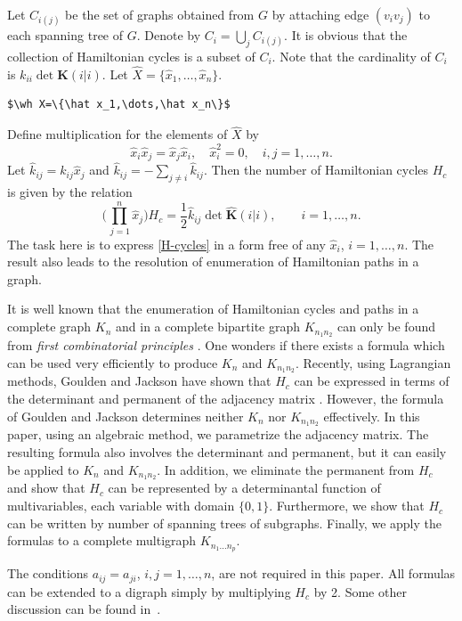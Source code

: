 \documentclass[manuscript, printscheme]{aomart}
\newtheorem[{}\it]{thm}{Theorem}[section]
\theoremstyle{definition}
\newtheorem*[{}\it]{notation}{Notation}
\newcommand{\wh}{\widehat}
\begin{document}
Let $C_{i(j)}$ be the set of graphs obtained from $G$ by attaching edge
$(v_iv_j)$ to each spanning tree of $G$. Denote by $C_i=\bigcup_j
C_{i(j)}$. It is obvious that the collection of Hamiltonian cycles is a
subset of $C_i$. Note that the cardinality of $C_i$ is $k_{ii}\det
\mathbf{K}(i|i)$. Let $\wh X=\{\hat x_1,\dots,\hat x_n\}$.
\begin{verbatim}
$\wh X=\{\hat x_1,\dots,\hat x_n\}$
\end{verbatim}
Define multiplication for the elements of $\wh X$ by
\begin{equation}\label{multdef}
\hat x_i\hat x_j=\hat x_j\hat x_i,\quad \hat x^2_i=0,\quad
i,j=1,\dots,n.
\end{equation}
Let $\hat k_{ij}=k_{ij}\hat x_j$ and $\hat k_{ij}=-\sum_{j\not=i} \hat
k_{ij}$. Then the number of Hamiltonian cycles $H_c$ is given by the
relation \cite{liuchow:formalsum}
\begin{equation}\label{H-cycles}
\biggl(\prod^n_{\,j=1}\hat x_j\biggr)H_c=\frac{1}{2}\hat k_{ij}\det
\wh{\mathbf{K}}(i|i),\qquad i=1,\dots,n.
\end{equation}
The task here is to express \eqref{H-cycles}
in a form free of any $\hat x_i$,
$i=1,\dots,n$. The result also leads to the resolution of enumeration of
Hamiltonian paths in a graph.

It is well known that the enumeration of Hamiltonian cycles and paths in
a complete graph $K_n$ and in a complete bipartite graph $K_{n_1n_2}$
can only be found from \textit{first combinatorial principles}
\cite{hapa:graphenum}. One wonders if there exists a formula which can
be used very efficiently to produce $K_n$ and $K_{n_1n_2}$. Recently,
using Lagrangian methods, Goulden and Jackson have shown that $H_c$ can
be expressed in terms of the determinant and permanent of the adjacency
matrix \cite{gouja:lagrmeth}. However, the formula of Goulden and
Jackson determines neither $K_n$ nor $K_{n_1n_2}$ effectively. In this
paper, using an algebraic method, we parametrize the adjacency matrix.
The resulting formula also involves the determinant and permanent, but
it can easily be applied to $K_n$ and $K_{n_1n_2}$. In addition, we
eliminate the permanent from $H_c$ and show that $H_c$ can be
represented by a determinantal function of multivariables, each variable
with domain $\{0,1\}$. Furthermore, we show that $H_c$ can be written by
number of spanning trees of subgraphs. Finally, we apply the formulas to
a complete multigraph $K_{n_1\dots n_p}$.

The conditions $a_{ij}=a_{ji}$, $i,j=1,\dots,n$, are not required in
this paper. All formulas can be extended to a digraph simply by
multiplying $H_c$ by 2.  Some other discussion can be found
in~\cite{fre:riesz,fre:cichon}.
\end{document}
